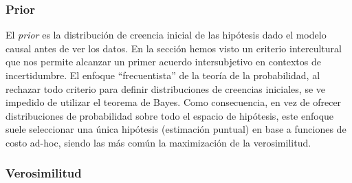 \documentclass[a4paper,11pt]{book}
\theoremstyle{definition}
\begin{document}
\subsubsection*{Prior}

El \emph{prior} es la distribuci\'on de creencia inicial de las hip\'otesis dado el modelo causal antes de ver los datos.
%
En la secci\'on \emph{} hemos visto un criterio intercultural que nos permite alcanzar un primer acuerdo intersubjetivo en contextos de incertidumbre.
%
El enfoque ``frecuentista'' de la teor\'ia de la probabilidad, al rechazar todo criterio para definir distribuciones de creencias iniciales, se ve impedido de utilizar el teorema de Bayes.
%
Como consecuencia, en vez de ofrecer distribuciones de probabilidad sobre todo el espacio de hip\'otesis, este enfoque suele seleccionar una \'unica hip\'otesis (estimaci\'on puntual) en base a funciones de costo ad-hoc, siendo las m\'as com\'un la maximizaci\'on de la verosimilitud.

\subsubsection*{Verosimilitud}
\end{document}
